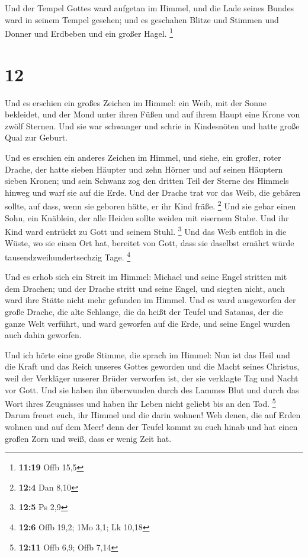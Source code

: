  Und der Tempel Gottes ward aufgetan im Himmel, und die
Lade seines Bundes ward in seinem Tempel gesehen; und es geschahen
Blitze und Stimmen und Donner und Erdbeben und ein großer Hagel.
\footnote{\textbf{11:19} Offb 15,5}

\hypertarget{section-3}{%
\section{12}\label{section-3}}

 Und es erschien ein großes Zeichen im Himmel: ein Weib, mit
der Sonne bekleidet, und der Mond unter ihren Füßen und auf ihrem Haupt
eine Krone von zwölf Sternen.  Und sie war schwanger und
schrie in Kindesnöten und hatte große Qual zur Geburt.

 Und es erschien ein anderes Zeichen im Himmel, und siehe,
ein großer, roter Drache, der hatte sieben Häupter und zehn Hörner und
auf seinen Häuptern sieben Kronen;  und sein Schwanz zog den
dritten Teil der Sterne des Himmels hinweg und warf sie auf die Erde.
Und der Drache trat vor das Weib, die gebären sollte, auf dass, wenn sie
geboren hätte, er ihr Kind fräße. \footnote{\textbf{12:4} Dan 8,10}
 Und sie gebar einen Sohn, ein Knäblein, der alle Heiden
sollte weiden mit eisernem Stabe. Und ihr Kind ward entrückt zu Gott und
seinem Stuhl. \footnote{\textbf{12:5} Ps 2,9}  Und das Weib
entfloh in die Wüste, wo sie einen Ort hat, bereitet von Gott, dass sie
daselbst ernährt würde tausendzweihundertsechzig Tage. \footnote{\textbf{12:6}
  Offb 19,2; 1Mo 3,1; Lk 10,18}

 Und es erhob sich ein Streit im Himmel: Michael und seine
Engel stritten mit dem Drachen; und der Drache stritt und seine Engel,
 und siegten nicht, auch ward ihre Stätte nicht mehr
gefunden im Himmel.  Und es ward ausgeworfen der große
Drache, die alte Schlange, die da heißt der Teufel und Satanas, der die
ganze Welt verführt, und ward geworfen auf die Erde, und seine Engel
wurden auch dahin geworfen.

 Und ich hörte eine große Stimme, die sprach im Himmel: Nun
ist das Heil und die Kraft und das Reich unseres Gottes geworden und die
Macht seines Christus, weil der Verkläger unserer Brüder verworfen ist,
der sie verklagte Tag und Nacht vor Gott.  Und sie haben
ihn überwunden durch des Lammes Blut und durch das Wort ihres Zeugnisses
und haben ihr Leben nicht geliebt bis an den Tod. \footnote{\textbf{12:11}
  Offb 6,9; Offb 7,14}  Darum freuet euch, ihr Himmel und
die darin wohnen! Weh denen, die auf Erden wohnen und auf dem Meer! denn
der Teufel kommt zu euch hinab und hat einen großen Zorn und weiß, dass
er wenig Zeit hat.

